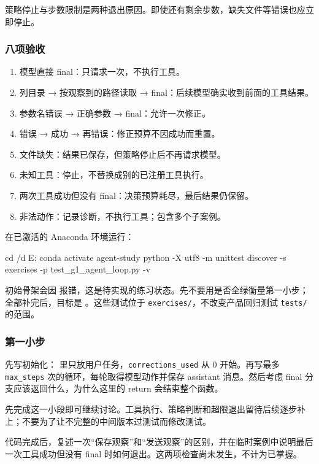 策略停止与步数限制是两种退出原因。即使还有剩余步数，缺失文件等错误也应立即停止。

\subsubsection{八项验收}

\begin{enumerate}
\item 模型直接 final：只请求一次，不执行工具。
\item 列目录 → 按观察到的路径读取 → final：后续模型确实收到前面的工具结果。
\item 参数名错误 → 正确参数 → final：允许一次修正。
\item 错误 → 成功 → 再错误：修正预算不因成功而重置。
\item 文件缺失：结果已保存，但策略停止后不再请求模型。
\item 未知工具：停止，不替换成别的已注册工具执行。
\item 两次工具成功但没有 final：决策预算耗尽，最后结果仍保留。
\item 非法动作：记录诊断，不执行工具；包含多个子案例。
\end{enumerate}

在已激活的 Anaconda 环境运行：

\begin{Code}
cd /d E:\study\agent
conda activate agent-study
python -X utf8 -m unittest discover -s exercises -p test_g1_agent_loop.py -v
\end{Code}

初始骨架会因  报错，这是待实现的练习状态。先不要用是否全绿衡量第一小步；全部补完后，目标是 。这些测试位于 \nolinkurl{exercises/}，不改变产品回归测试 \nolinkurl{tests/} 的范围。

\subsubsection{第一小步}

先写初始化： 里只放用户任务，\nolinkurl{corrections_used} 从 0 开始。再写最多 \nolinkurl{max_steps} 次的循环，每轮取得模型动作并保存 assistant 消息。然后考虑 final 分支应该返回什么，为什么这里的 return 会结束整个函数。

先完成这一小段即可继续讨论。工具执行、策略判断和超限退出留待后续逐步补上；不要为了让不完整的中间版本过测试而修改测试。

代码完成后，复述一次“保存观察”和“发送观察”的区别，并在临时案例中说明最后一次工具成功但没有 final 时如何退出。这两项检查尚未发生，不计为已掌握。

